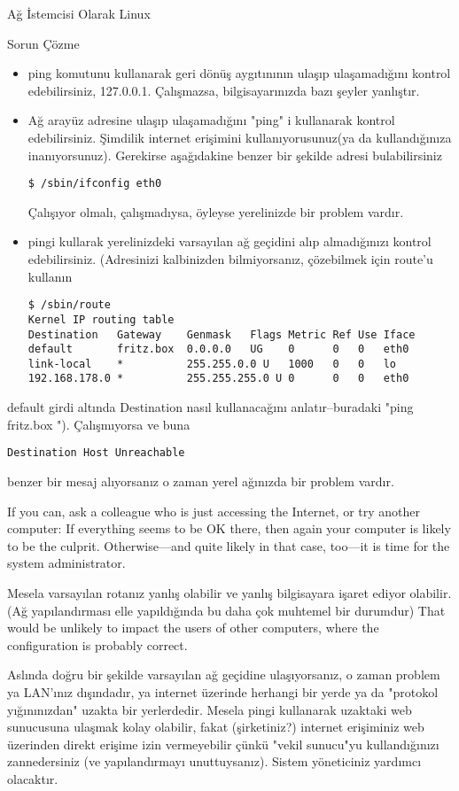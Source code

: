 \begin{section}{Ağ İstemcisi Olarak Linux}
\begin{subsection}{Sorun Çözme}
\begin{itemize}
\item ping komutunu kullanarak geri dönüş aygıtınının ulaşıp ulaşamadığını kontrol edebilirsiniz, 127.0.0.1. Çalışmazsa, bilgisayarınızda bazı şeyler yanlıştır.
\item Ağ arayüz adresine ulaşıp ulaşamadığını "ping" i kullanarak kontrol edebilirsiniz. Şimdilik internet erişimini kullanıyorusunuz(ya da kullandığınıza inanıyorsunuz). Gerekirse aşağıdakine benzer bir şekilde adresi bulabilirsiniz
\begin{verbatim}
$ /sbin/ifconfig eth0
\end{verbatim}
Çalışıyor olmalı, çalışmadıysa, öyleyse yerelinizde bir problem vardır.
\item pingi kullarak yerelinizdeki varsayılan ağ geçidini alıp almadığınızı kontrol edebilirsiniz. (Adresinizi kalbinizden bilmiyorsanız, çözebilmek için route'u kullanın
\begin{verbatim}
$ /sbin/route
Kernel IP routing table
Destination   Gateway    Genmask   Flags Metric Ref Use Iface
default       fritz.box  0.0.0.0   UG    0      0   0   eth0
link-local    *          255.255.0.0 U   1000   0   0   lo
192.168.178.0 *          255.255.255.0 U 0      0   0   eth0
\end{verbatim}
\end{itemize}
default girdi altında Destination nasıl kullanacağını anlatır--buradaki  "ping fritz.box "). Çalışmıyorsa ve buna 
\begin{verbatim}
Destination Host Unreachable
\end{verbatim}
benzer bir mesaj alıyorsanız o zaman yerel ağınızda bir problem vardır.

If you can, ask a colleague who is just accessing the Internet, or try another computer: If everything seems to be OK there, then again your computer is likely to be the culprit. Otherwise—and quite likely in that case, too—it is time for the system administrator.

Mesela varsayılan rotanız yanlış olabilir ve yanlış bilgisayara işaret ediyor olabilir.(Ağ yapılandırması elle yapıldığında bu daha çok muhtemel bir durumdur) That would be unlikely to impact the users of other computers, where the configuration is probably correct.

Aslında doğru bir şekilde varsayılan ağ geçidine ulaşıyorsanız, o zaman problem ya LAN'ınız dışındadır, ya internet üzerinde herhangi bir yerde ya da "protokol yığınınızdan" uzakta bir yerlerdedir. Mesela pingi kullanarak uzaktaki web sunucusuna ulaşmak kolay olabilir, fakat (şirketiniz?) internet erişiminiz web üzerinden direkt erişime izin vermeyebilir çünkü "vekil sunucu"yu kullandığınızı zannedersiniz (ve yapılandırmayı unuttuysanız). Sistem yöneticiniz yardımcı olacaktır. 


\end{subsection}
\end{section}
